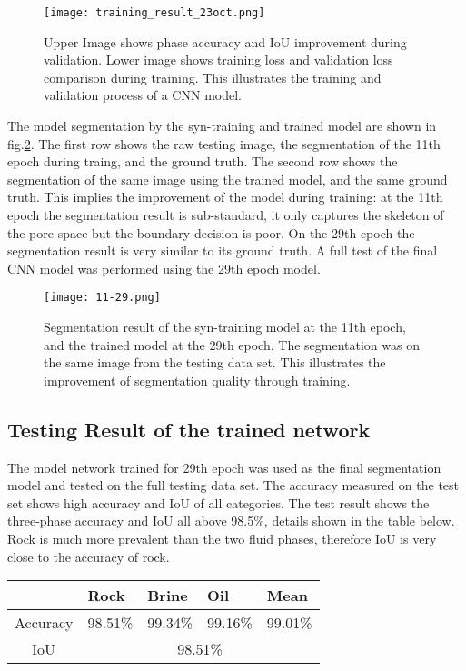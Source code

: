 \documentclass[draft,linenumbers]{agujournal2018}
\begin{document}
\begin{figure}[h]
 \centering
 \texttt{[image: training\_result\_23oct.png]}
 \caption{Upper Image shows phase accuracy and IoU improvement during validation. Lower image shows training loss and validation loss comparison during training. This illustrates the training and validation process of a CNN model.}
 \label{crossval}
 \end{figure}
 
 The model segmentation by the syn-training and trained model are shown in fig.\ref{1129}. The first row shows the raw testing image, the segmentation of the 11th epoch during traing, and the ground truth. The second row shows the segmentation of the same image using the trained model, and the same ground truth. This implies the improvement of the model during training: at the 11th epoch the segmentation result is sub-standard, it only captures the skeleton of the pore space but the boundary decision is poor. On the 29th epoch the segmentation result is very similar to its ground truth. A full test of the final CNN model was performed using the 29th epoch model.
 
 \begin{figure}[h]
 \centering
 \texttt{[image: 11-29.png]}
 \caption{Segmentation result of the syn-training model at the 11th epoch, and the trained model at the 29th epoch. The segmentation was on the same image from the testing data set. This illustrates the improvement of segmentation quality through training.}
 \label{1129}
 \end{figure}
 
\subsection{Testing Result of the trained network}
The model network trained for 29th epoch was used as the final segmentation model and tested on the full testing data set. The accuracy measured on the test set shows high accuracy and IoU of all categories. The test result shows the three-phase accuracy and IoU all above 98.5\%, details shown in the table below. Rock is much more prevalent than the two fluid phases, therefore IoU is very close to the accuracy of rock.
\begin{table}[]\label{acc}
\centering
\begin{tabular}{lllll}
\cline{2-5}
 & Rock & Brine & Oil & Mean \\ \hline
Accuracy & 98.51\% & 99.34\% & 99.16\% & 99.01\% \\ \hline
\multicolumn{1}{c}{IoU} & \multicolumn{4}{c}{98.51\%} \\ \hline
\end{tabular}
\end{table}
\end{document}
